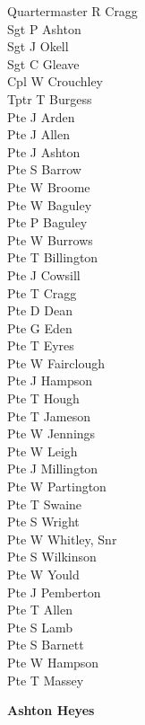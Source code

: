 \begin{multicols}{3}
  \small
  \noindent
  Quartermaster R Cragg \\
  Sgt P Ashton \\
  Sgt J Okell \\
  Sgt C Gleave \\
  Cpl W Crouchley \\
  Tptr T Burgess \\
  Pte J Arden \\
  Pte J Allen \\
  Pte J Ashton \\
  Pte S Barrow \\
  Pte W Broome \\
  Pte W Baguley \\
  Pte P Baguley \\
  Pte W Burrows \\
  Pte T Billington \\
  Pte J Cowsill \\
  Pte T Cragg \\
  Pte D Dean \\
  Pte G Eden \\
  Pte T Eyres \\
  Pte W Fairclough \\
  Pte J Hampson \\
  Pte T Hough \\
  Pte T Jameson \\
  Pte W Jennings \\
  Pte W Leigh \\
  Pte J Millington \\
  Pte W Partington \\
  Pte T Swaine \\
  Pte S Wright \\
  Pte W Whitley, Snr \\
  Pte S Wilkinson \\
  Pte W Yould \\
  Pte J Pemberton \\
  Pte T Allen \\
  Pte S Lamb \\
  Pte S Barnett \\
  Pte W Hampson \\
  Pte T Massey \\
\end{multicols}

\vspace*{10mm}

\begin{center}
  \Large
  \textbf{Ashton Heyes}
\end{center}

